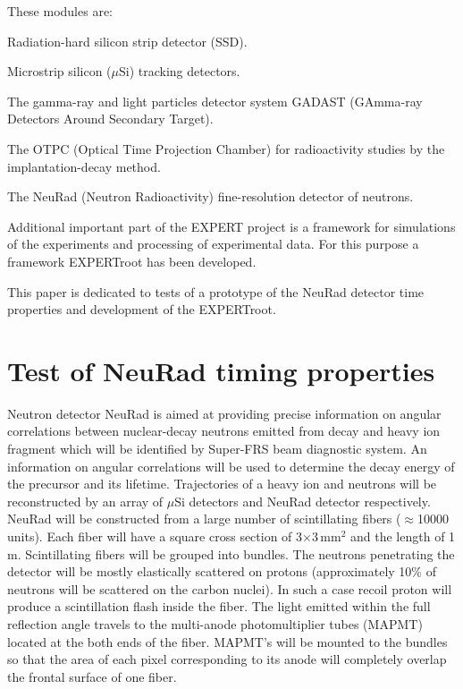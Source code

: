 \documentclass{webofc}
\begin{document}
These modules are:
\begin{inparaenum}[(i)]
	\item Radiation-hard silicon strip detector (SSD).
	\item Microstrip silicon ($\mu$Si) tracking detectors.
	\item The gamma-ray and light particles detector system GADAST (GAmma-ray Detectors Around Secondary Target).
	\item The OTPC (Optical Time Projection Chamber) for radioactivity studies by the implantation-decay method.
	\item The NeuRad (Neutron Radioactivity) fine-resolution detector of neutrons.
\end{inparaenum}

Additional important part of the EXPERT project is a framework for simulations of the experiments and processing of experimental data. For this purpose a framework EXPERTroot \cite{er} has been developed. %

This paper is dedicated to tests of a prototype of the NeuRad detector time properties and development of the EXPERTroot.

\section{Test of NeuRad timing properties}
Neutron detector NeuRad is aimed at providing precise information on angular correlations between nuclear-decay neutrons emitted from decay and heavy ion fragment which will be identified by Super-FRS beam diagnostic system. An information on angular correlations will be used to determine the decay energy of the precursor and its lifetime. Trajectories of a heavy ion and neutrons will be reconstructed by an array of $\mu$Si detectors and NeuRad detector respectively. %
NeuRad will be constructed from a large number of scintillating fibers ($\approx$10000 units). Each fiber will have a square cross section of 3$\times$3\,mm$^2$ and the length of 1\,m. Scintillating fibers will be grouped into bundles. 
The neutrons penetrating the detector will be mostly elastically scattered on protons (approximately 10\% of neutrons will be scattered on the carbon nuclei). In such a case recoil proton will produce a scintillation flash inside the fiber. The light emitted within the full reflection angle travels to the multi-anode photomultiplier tubes (MAPMT) located at the both ends of the fiber.
MAPMT's will be mounted to the bundles so that the area of each pixel corresponding to its anode will completely overlap the frontal surface of one fiber.
\end{document}
